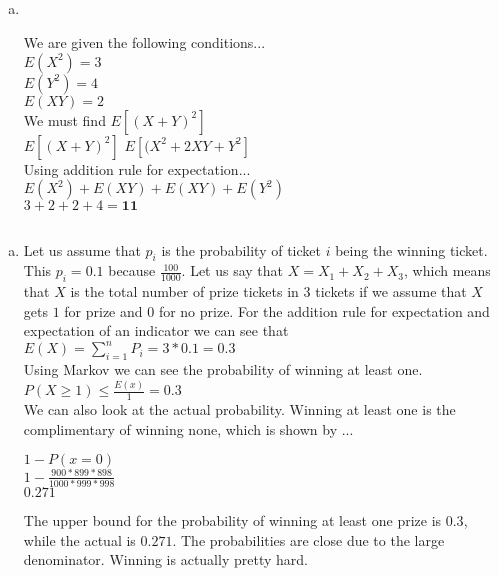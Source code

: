 \documentclass[10pt]{report}
\begin{document}
 \subsection{}
 \begin{enumerate}[(a)]
 \item \ \\
 \begin{center}
 We are given the following conditions... \\
 $E(X^2) = 3 $ \\
 $E(Y^2) = 4 $ \\
 $E(XY) = 2 $ \\
 We must find $E[(X+Y)^2] $ \\
 $E[(X+Y) ^ 2]$
 $E[(X^2 + 2XY + Y^2 ] $ \\
 Using addition rule for expectation...\\
 $E(X^2) + E(XY) + E(XY) + E(Y^2)$ \\
 $3 + 2 + 2 + 4 = \mathbf{11}$
 \end{center}
 \end{enumerate}
  \setcounter{subsection}{10}
    \subsection{}
 \begin{enumerate}[(a)]
 \item Let us assume that $p_i $ is the probability of ticket $i$ being the winning ticket. This $p_i = 0.1 $ because $\frac{100}{1000} $. Let us say that $X = X_1 + X_2 + X_3 $, which means that $X $ is the total number of prize tickets in $3 $ tickets if we assume that $X $ gets $1 $ for prize and $0 $ for no prize. For the addition rule for expectation and expectation of an indicator we can see that $E(X) = \sum_{i=1}^{n} P_i = 3*0.1 = 0.3 $ \\
 Using Markov we can see the probability of winning at least one. \\
 $P(X \geq 1 ) \leq \frac{E(x)}{1}  = 0.3 $ \\
We can also look at the actual probability. Winning at least one is the complimentary of winning none, which is shown by ...\\
\begin{center}
$ 1 - P(x = 0) $ \\
$ 1 - \frac{900 * 899 * 898}{1000 * 999 * 998}$ \\
$ 0.271 $
\end{center}
The upper bound for the probability of winning at least one prize is $0.3 $, while the actual is $0.271 $. The probabilities are close due to the large denominator. Winning is actually pretty hard. 
 \end{enumerate}
   \setcounter{subsection}{13}
\end{document}
